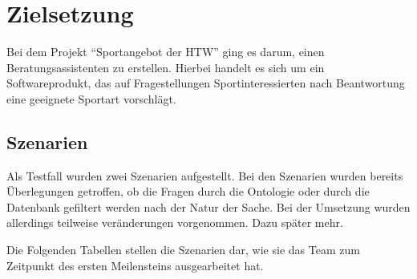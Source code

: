 \chapter{Zielsetzung}

Bei dem Projekt "`Sportangebot der HTW"' ging es darum, einen Beratungsassistenten zu erstellen. Hierbei handelt es sich um ein Softwareprodukt, das auf Fragestellungen Sportinteressierten nach Beantwortung eine geeignete Sportart vorschlägt.

\section{Szenarien}

Als Testfall wurden zwei Szenarien aufgestellt. Bei den Szenarien wurden bereits Überlegungen getroffen, ob die Fragen durch die Ontologie oder durch die Datenbank gefiltert werden nach der Natur der Sache. Bei der Umsetzung wurden allerdings teilweise veränderungen vorgenommen. Dazu später mehr.

Die Folgenden Tabellen stellen die Szenarien dar, wie sie das Team zum Zeitpunkt des ersten Meilensteins ausgearbeitet hat.

